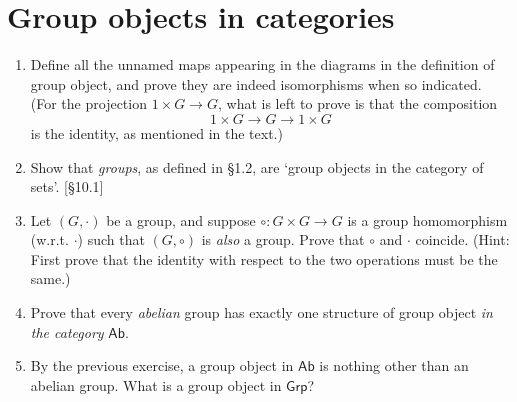\section{Group objects in categories}
\begin{enumerate}
    \item Define all the unnamed maps appearing in the diagrams in the definition of group object, and prove they are indeed isomorphisms when so indicated. (For the projection $1 \times G \to G$, what is left to prove is that the composition
          \[ 1 \times G \to G \to 1 \times G \]
          is the identity, as mentioned in the text.)

    \item Show that \emph{groups}, as defined in \S1.2, are `group objects in the category of sets'. [\S10.1]

    \item Let $(G, \cdot)$ be a group, and suppose $\circ: G \times G \to G$ is a group homomorphism (w.r.t. $\cdot$) such that $(G, \circ)$ is \emph{also} a group. Prove that $\circ$ and $\cdot$ coincide. (Hint: First prove that the identity with respect to the two operations must be the same.)

    \item Prove that every \emph{abelian} group has exactly one structure of group object \emph{in the category} $\mathsf{Ab}$.

    \item By the previous exercise, a group object in $\mathsf{Ab}$ is nothing other than an abelian group. What is a group object in $\mathsf{Grp}$?
\end{enumerate}